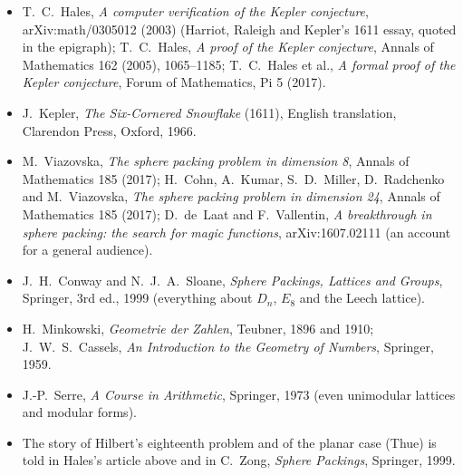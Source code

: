 \begin{itemize}
\item T.~C.~Hales, \emph{A computer verification of the Kepler conjecture}, arXiv:math/0305012 (2003) (Harriot, Raleigh and Kepler's 1611 essay, quoted in the
epigraph); T.~C.~Hales, \emph{A proof of the Kepler conjecture}, Annals of Mathematics 162 (2005), 1065--1185; T.~C.~Hales et al., \emph{A formal proof of the
Kepler conjecture}, Forum of Mathematics, Pi 5 (2017).
\item J.~Kepler, \emph{The Six-Cornered Snowflake} (1611), English translation, Clarendon Press, Oxford, 1966.
\item M.~Viazovska, \emph{The sphere packing problem in dimension 8}, Annals of Mathematics 185 (2017); H.~Cohn, A.~Kumar, S.~D.~Miller, D.~Radchenko and
M.~Viazovska, \emph{The sphere packing problem in dimension 24}, Annals of Mathematics 185 (2017); D.~de~Laat and F.~Vallentin, \emph{A breakthrough in sphere
packing: the search for magic functions}, arXiv:1607.02111 (an account for a general audience).
\item J.~H.~Conway and N.~J.~A.~Sloane, \emph{Sphere Packings, Lattices and Groups}, Springer, 3rd ed., 1999 (everything about $D_n$, $E_8$ and the Leech lattice).
\item H.~Minkowski, \emph{Geometrie der Zahlen}, Teubner, 1896 and 1910; J.~W.~S.~Cassels, \emph{An Introduction to the Geometry of Numbers}, Springer, 1959.
\item J.-P.~Serre, \emph{A Course in Arithmetic}, Springer, 1973 (even unimodular lattices and modular forms).
\item The story of Hilbert's eighteenth problem and of the planar case (Thue) is told in Hales's article above and in C.~Zong, \emph{Sphere Packings},
Springer, 1999.
\end{itemize}
